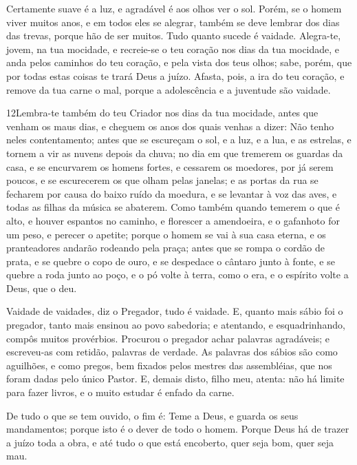 Certamente suave é a luz, e agradável é aos olhos ver o sol.
Porém, se o homem viver muitos anos, e em todos eles se alegrar,
também se deve lembrar dos dias das trevas, porque hão de ser
muitos. Tudo quanto sucede é vaidade. Alegra-te, jovem, na tua
mocidade, e recreie-se o teu coração nos dias da tua mocidade, e
anda pelos caminhos do teu coração, e pela vista dos teus olhos;
sabe, porém, que por todas estas coisas te trará Deus a juízo.
Afasta, pois, a ira do teu coração, e remove da tua carne o
mal, porque a adolescência e a juventude são vaidade.

\medskip

\lettrine{12} Lembra-te também do teu Criador nos dias da tua
mocidade, antes que venham os maus dias, e cheguem os anos dos quais
venhas a dizer: Não tenho neles contentamento; antes que se
escureçam o sol, e a luz, e a lua, e as estrelas, e tornem a vir as
nuvens depois da chuva; no dia em que tremerem os guardas da
casa, e se encurvarem os homens fortes, e cessarem os moedores, por
já serem poucos, e se escurecerem os que olham pelas janelas; e
as portas da rua se fecharem por causa do baixo ruído da moedura, e
se levantar à voz das aves, e todas as filhas da música se abaterem.
Como também quando temerem o que é alto, e houver espantos no
caminho, e florescer a amendoeira, e o gafanhoto for um peso, e
perecer o apetite; porque o homem se vai à sua casa eterna, e os
pranteadores andarão rodeando pela praça; antes que se rompa o
cordão de prata, e se quebre o copo de ouro, e se despedace o
cântaro junto à fonte, e se quebre a roda junto ao poço, e o pó
volte à terra, como o era, e o espírito volte a Deus, que o deu.

Vaidade de vaidades, diz o  Pregador, tudo é vaidade. E,
quanto mais sábio foi o pregador, tanto mais ensinou ao povo
sabedoria; e atentando, e esquadrinhando, compôs muitos provérbios.
Procurou o pregador achar palavras agradáveis; e escreveu-as
com retidão, palavras de verdade. As palavras dos sábios são
como aguilhões, e como pregos, bem fixados pelos mestres das
assembléias, que nos foram dadas pelo único Pastor. E, demais
disto, filho meu, atenta: não há limite para fazer livros, e o muito
estudar é enfado da carne.

De tudo o que se tem ouvido, o fim é: Teme a Deus, e guarda os
seus mandamentos; porque isto é o dever de todo o homem.
Porque Deus há de trazer a juízo toda a obra, e até tudo o
que está encoberto, quer seja bom, quer seja mau.

